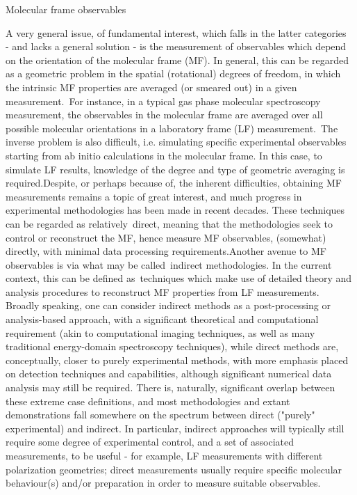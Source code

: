 Molecular frame observables

A very general issue, of fundamental interest, which falls in the latter categories  - and lacks a general solution - is the measurement of observables which depend on the orientation of the molecular frame (MF). In general, this can be regarded as a geometric problem in the spatial (rotational) degrees of freedom, in which the intrinsic MF properties are averaged (or smeared out) in a given measurement. For instance, in a typical gas phase molecular spectroscopy measurement, the observables in the molecular frame  are averaged over all possible molecular orientations in a laboratory frame (LF) measurement. The inverse problem is also difficult, i.e. simulating specific experimental observables starting from ab initio calculations in the molecular frame. In this case, to simulate LF results, knowledge of the degree and type of geometric averaging is required.Despite, or perhaps because of, the inherent difficulties, obtaining  MF measurements remains a topic of great interest, and much progress in experimental methodologies has been made in recent decades. These techniques can be regarded as relatively direct, meaning that the methodologies seek to control or reconstruct the MF, hence measure MF observables, (somewhat) directly, with minimal data processing requirements.Another avenue to MF observables is via what may be called indirect methodologies. In the current context, this can be defined as techniques which make use of detailed theory and analysis procedures to reconstruct MF properties from LF measurements. Broadly speaking, one can consider indirect methods as a post-processing or analysis-based approach, with a significant theoretical and computational requirement (akin to computational imaging techniques, as well as many traditional energy-domain spectroscopy techniques), while direct methods are, conceptually, closer to purely experimental methods, with more emphasis placed on detection techniques and capabilities, although significant numerical data analysis may still be required. There is, naturally, significant overlap between these extreme case definitions, and most methodologies and extant demonstrations fall somewhere on the spectrum between direct ("purely" experimental) and indirect. In particular, indirect approaches will typically still require some degree of experimental control, and a set of associated measurements, to be useful - for example, LF measurements with different polarization geometries; direct measurements usually require specific molecular behaviour(s) and/or preparation in order to measure suitable observables.